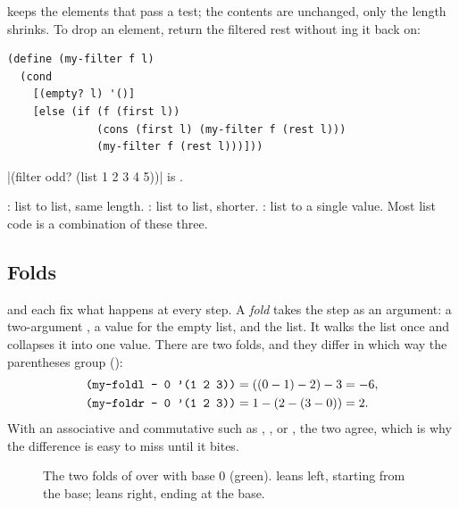  keeps the elements that pass a test; the contents are unchanged, only the length shrinks. To drop an element, return the filtered rest without ing it back on:
\begin{lstlisting}
(define (my-filter f l)
  (cond
    [(empty? l) '()]
    [else (if (f (first l))
              (cons (first l) (my-filter f (rest l)))
              (my-filter f (rest l)))]))
\end{lstlisting}
\rkt|(filter odd? (list 1 2 3 4 5))| is .

\begin{keypoint}
: list to list, same length. : list to list, shorter. : list to a single value. Most list code is a combination of these three.
\end{keypoint}

\subsection{Folds}

 and  each fix what happens at every step. A \emph{fold} takes the step as an argument: a two-argument , a  value for the empty list, and the list. It walks the list once and collapses it into one value. There are two folds, and they differ in which way the parentheses group ():
\begin{align*}
\texttt{(my-foldl - 0 '(1 2 3))} &= ((0 - 1) - 2) - 3 = -6, \\
\texttt{(my-foldr - 0 '(1 2 3))} &= 1 - (2 - (3 - 0)) = 2.
\end{align*}
With an associative and commutative  such as \code{+}, \code{*}, or , the two agree, which is why the difference is easy to miss until it bites.

\begin{figure}[htbp]
\centering
{}
\hspace{2cm}
\caption{The two folds of \code{-} over  with base 0 (green).  leans left, starting from the base;  leans right, ending at the base.}
\label{fig:folds}
\end{figure}

